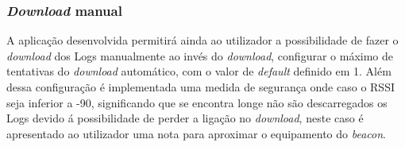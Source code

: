 
\subsubsection{\textit{Download} manual}
\par A aplicação desenvolvida permitirá ainda ao utilizador a possibilidade de fazer o \textit{download} dos Logs manualmente ao invés do \textit{download}, configurar o máximo de tentativas do \textit{download} automático, com o valor de \textit{default} definido em 1. Além dessa configuração é implementada uma medida de segurança onde caso o RSSI seja inferior a -90, significando que se encontra longe não são descarregados os Logs devido á possibilidade de perder a ligação no \textit{download}, neste caso é apresentado ao utilizador uma nota para aproximar o equipamento do \textit{beacon}. %

